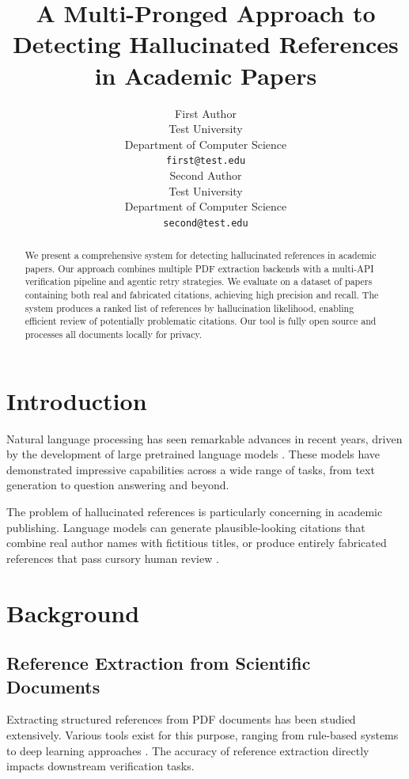 \documentclass[11pt]{article}
\title{A Multi-Pronged Approach to Detecting Hallucinated References in Academic Papers}
\author{First Author \\
  Test University \\
  Department of Computer Science \\
  \texttt{first@test.edu} \\\And
  Second Author \\
  Test University \\
  Department of Computer Science \\
  \texttt{second@test.edu} \\}
\begin{document}
\maketitle

\begin{abstract}
We present a comprehensive system for detecting hallucinated references in academic papers. Our approach combines multiple PDF extraction backends with a multi-API verification pipeline and agentic retry strategies. We evaluate on a dataset of papers containing both real and fabricated citations, achieving high precision and recall. The system produces a ranked list of references by hallucination likelihood, enabling efficient review of potentially problematic citations. Our tool is fully open source and processes all documents locally for privacy.
\end{abstract}

\section{Introduction}

Natural language processing has seen remarkable advances in recent years, driven by the development of large pretrained language models \cite{devlin-etal-2019-bert,vaswani-etal-2017-attention,brown-etal-2020-language}. These models have demonstrated impressive capabilities across a wide range of tasks, from text generation to question answering and beyond.

\lipsum[1-3]

The problem of hallucinated references is particularly concerning in academic publishing. Language models can generate plausible-looking citations that combine real author names with fictitious titles, or produce entirely fabricated references that pass cursory human review \cite{liu2019roberta,raffel-etal-2020-exploring}.

\lipsum[4-5]

\section{Background}

\subsection{Reference Extraction from Scientific Documents}

Extracting structured references from PDF documents has been studied extensively. Various tools exist for this purpose, ranging from rule-based systems to deep learning approaches \cite{wolf-etal-2020-transformers}. The accuracy of reference extraction directly impacts downstream verification tasks.
\end{document}
